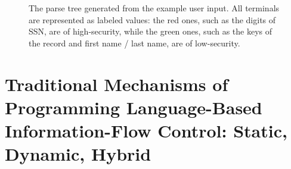 \begin{figure*}[tbp]
  \small
  \center
{}
\caption{The parse tree generated from the example user input.
  All terminals are represented as labeled values:
  the {\color{red} red} ones, such as the digits of SSN,
  are of high-security, while the {\color{green} green} ones, such as the keys
  of the record and first name / last name, are of low-security.}
\label{fig:parsetree}
\end{figure*}

\section{Traditional Mechanisms of Programming Language-Based
         Information-Flow Control: Static, Dynamic, Hybrid}

